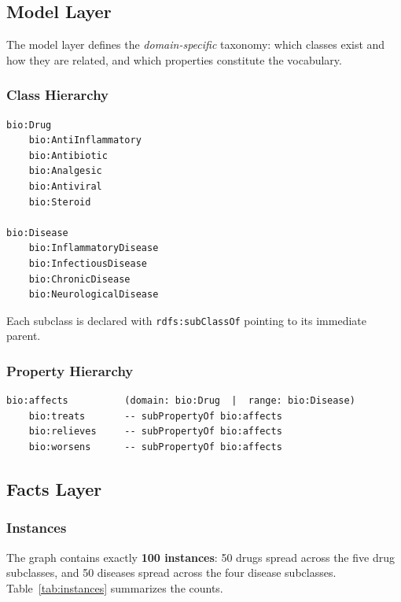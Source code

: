 \documentclass[11pt,a4paper]{article}
\begin{document}
\subsection{Model Layer}

The model layer defines the \emph{domain-specific} taxonomy: which classes
exist and how they are related, and which properties constitute the vocabulary.

\subsubsection*{Class Hierarchy}

\begin{verbatim}
bio:Drug
    bio:AntiInflammatory
    bio:Antibiotic
    bio:Analgesic
    bio:Antiviral
    bio:Steroid

bio:Disease
    bio:InflammatoryDisease
    bio:InfectiousDisease
    bio:ChronicDisease
    bio:NeurologicalDisease
\end{verbatim}

Each subclass is declared with \texttt{rdfs:subClassOf} pointing to its
immediate parent.

\subsubsection*{Property Hierarchy}

\begin{verbatim}
bio:affects          (domain: bio:Drug  |  range: bio:Disease)
    bio:treats       -- subPropertyOf bio:affects
    bio:relieves     -- subPropertyOf bio:affects
    bio:worsens      -- subPropertyOf bio:affects
\end{verbatim}



\subsection{Facts Layer}

\subsubsection*{Instances}

The graph contains exactly \textbf{100 instances}: 50 drugs spread across the
five drug subclasses, and 50 diseases spread across the four disease subclasses.
Table~\ref{tab:instances} summarizes the counts.
\end{document}
